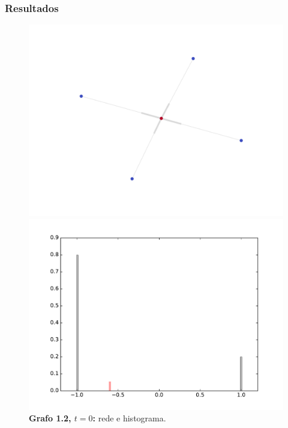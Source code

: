 \begin{frame}
  \frametitle{Resultados}

  \begin{figure}
  \centering
  \begin{minipage}{5.5cm}
    \includegraphics[width=\textwidth]{./figures/12N0}
  \end{minipage}
  \begin{minipage}{5.5cm}
    \includegraphics[width=\textwidth]{./figures/12H0}
  \end{minipage}
  \vspace{5mm}
  \caption*{\textbf{Grafo 1.2, $t = 0$:} rede e histograma.}
  \end{figure}
\end{frame}


